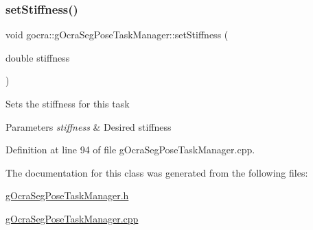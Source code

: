 \subsubsection{\texorpdfstring{set\+Stiffness()}{setStiffness()}}
{\footnotesize\ttfamily void gocra\+::g\+Ocra\+Seg\+Pose\+Task\+Manager\+::set\+Stiffness (\begin{DoxyParamCaption}\item[{double}]{stiffness }\end{DoxyParamCaption})}

Sets the stiffness for this task


\begin{DoxyParams}{Parameters}
{\em stiffness} & Desired stiffness \\
\hline
\end{DoxyParams}


Definition at line 94 of file g\+Ocra\+Seg\+Pose\+Task\+Manager.\+cpp.



The documentation for this class was generated from the following files\+:\begin{DoxyCompactItemize}
\item 
\hyperlink{gOcraSegPoseTaskManager_8h}{g\+Ocra\+Seg\+Pose\+Task\+Manager.\+h}\item 
\hyperlink{gOcraSegPoseTaskManager_8cpp}{g\+Ocra\+Seg\+Pose\+Task\+Manager.\+cpp}\end{DoxyCompactItemize}

